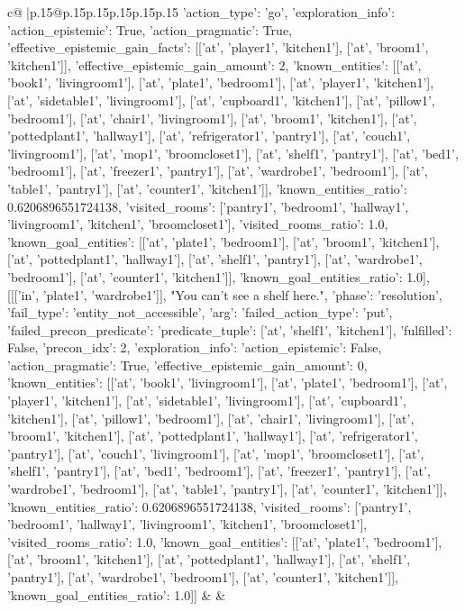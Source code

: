 \documentclass{article}
\begin{document}
{\begin{supertabular}{c@{$\;$}|p{.15\linewidth}@{}p{.15\linewidth}p{.15\linewidth}p{.15\linewidth}p{.15\linewidth}p{.15\linewidth}}
{{{{'action_type': 'go', 'exploration_info': {'action_epistemic': True, 'action_pragmatic': True, 'effective_epistemic_gain_facts': [['at', 'player1', 'kitchen1'], ['at', 'broom1', 'kitchen1']], 'effective_epistemic_gain_amount': 2, 'known_entities': [['at', 'book1', 'livingroom1'], ['at', 'plate1', 'bedroom1'], ['at', 'player1', 'kitchen1'], ['at', 'sidetable1', 'livingroom1'], ['at', 'cupboard1', 'kitchen1'], ['at', 'pillow1', 'bedroom1'], ['at', 'chair1', 'livingroom1'], ['at', 'broom1', 'kitchen1'], ['at', 'pottedplant1', 'hallway1'], ['at', 'refrigerator1', 'pantry1'], ['at', 'couch1', 'livingroom1'], ['at', 'mop1', 'broomcloset1'], ['at', 'shelf1', 'pantry1'], ['at', 'bed1', 'bedroom1'], ['at', 'freezer1', 'pantry1'], ['at', 'wardrobe1', 'bedroom1'], ['at', 'table1', 'pantry1'], ['at', 'counter1', 'kitchen1']], 'known_entities_ratio': 0.6206896551724138, 'visited_rooms': ['pantry1', 'bedroom1', 'hallway1', 'livingroom1', 'kitchen1', 'broomcloset1'], 'visited_rooms_ratio': 1.0, 'known_goal_entities': [['at', 'plate1', 'bedroom1'], ['at', 'broom1', 'kitchen1'], ['at', 'pottedplant1', 'hallway1'], ['at', 'shelf1', 'pantry1'], ['at', 'wardrobe1', 'bedroom1'], ['at', 'counter1', 'kitchen1']], 'known_goal_entities_ratio': 1.0}}], [[['in', 'plate1', 'wardrobe1']], "You can't see a shelf here.", {'phase': 'resolution', 'fail_type': 'entity_not_accessible', 'arg': {'failed_action_type': 'put', 'failed_precon_predicate': {'predicate_tuple': ['at', 'shelf1', 'kitchen1'], 'fulfilled': False, 'precon_idx': 2}}, 'exploration_info': {'action_epistemic': False, 'action_pragmatic': True, 'effective_epistemic_gain_amount': 0, 'known_entities': [['at', 'book1', 'livingroom1'], ['at', 'plate1', 'bedroom1'], ['at', 'player1', 'kitchen1'], ['at', 'sidetable1', 'livingroom1'], ['at', 'cupboard1', 'kitchen1'], ['at', 'pillow1', 'bedroom1'], ['at', 'chair1', 'livingroom1'], ['at', 'broom1', 'kitchen1'], ['at', 'pottedplant1', 'hallway1'], ['at', 'refrigerator1', 'pantry1'], ['at', 'couch1', 'livingroom1'], ['at', 'mop1', 'broomcloset1'], ['at', 'shelf1', 'pantry1'], ['at', 'bed1', 'bedroom1'], ['at', 'freezer1', 'pantry1'], ['at', 'wardrobe1', 'bedroom1'], ['at', 'table1', 'pantry1'], ['at', 'counter1', 'kitchen1']], 'known_entities_ratio': 0.6206896551724138, 'visited_rooms': ['pantry1', 'bedroom1', 'hallway1', 'livingroom1', 'kitchen1', 'broomcloset1'], 'visited_rooms_ratio': 1.0, 'known_goal_entities': [['at', 'plate1', 'bedroom1'], ['at', 'broom1', 'kitchen1'], ['at', 'pottedplant1', 'hallway1'], ['at', 'shelf1', 'pantry1'], ['at', 'wardrobe1', 'bedroom1'], ['at', 'counter1', 'kitchen1']], 'known_goal_entities_ratio': 1.0}}]] 
	  } 
	   } 
	   } 
	 & & \\ 
 


\end{supertabular}}
\end{document}
